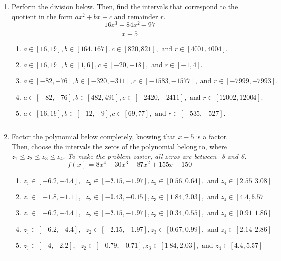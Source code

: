 \documentclass[14pt]{extbook}
\newcommand{\litem}[1]{\item#1\hspace*{-1cm}\rule{\textwidth}{0.4pt}}
\begin{document}
\begin{enumerate}
{\begin{enumerate}[label=\Alph*.]
\end{enumerate} }
\litem{
Perform the division below. Then, find the intervals that correspond to the quotient in the form $ax^2+bx+c$ and remainder $r$.\[ \frac{16x^{3} +84 x^{2} -97}{x + 5} \]\begin{enumerate}[label=\Alph*.]
\item \( a \in [16, 19], b \in [164, 167], c \in [820, 821], \text{ and } r \in [4001, 4004]. \)
\item \( a \in [16, 19], b \in [1, 6], c \in [-20, -18], \text{ and } r \in [-1, 4]. \)
\item \( a \in [-82, -76], b \in [-320, -311], c \in [-1583, -1577], \text{ and } r \in [-7999, -7993]. \)
\item \( a \in [-82, -76], b \in [482, 491], c \in [-2420, -2411], \text{ and } r \in [12002, 12004]. \)
\item \( a \in [16, 19], b \in [-12, -9], c \in [69, 77], \text{ and } r \in [-535, -527]. \)

\end{enumerate} }
\litem{
Factor the polynomial below completely, knowing that $x -5$ is a factor. Then, choose the intervals the zeros of the polynomial belong to, where $z_1 \leq z_2 \leq z_3 \leq z_4$. \textit{To make the problem easier, all zeros are between -5 and 5.}\[ f(x) = 8x^{4} -30 x^{3} -87 x^{2} +155 x + 150 \]\begin{enumerate}[label=\Alph*.]
\item \( z_1 \in [-6.2, -4.4], \text{   }  z_2 \in [-2.15, -1.97], z_3 \in [0.56, 0.64], \text{   and   } z_4 \in [2.55, 3.08] \)
\item \( z_1 \in [-1.8, -1.1], \text{   }  z_2 \in [-0.43, -0.15], z_3 \in [1.84, 2.03], \text{   and   } z_4 \in [4.4, 5.57] \)
\item \( z_1 \in [-6.2, -4.4], \text{   }  z_2 \in [-2.15, -1.97], z_3 \in [0.34, 0.55], \text{   and   } z_4 \in [0.91, 1.86] \)
\item \( z_1 \in [-6.2, -4.4], \text{   }  z_2 \in [-2.15, -1.97], z_3 \in [0.67, 0.99], \text{   and   } z_4 \in [2.14, 2.86] \)
\item \( z_1 \in [-4, -2.2], \text{   }  z_2 \in [-0.79, -0.71], z_3 \in [1.84, 2.03], \text{   and   } z_4 \in [4.4, 5.57] \)


\end{enumerate}}
\end{enumerate}
\end{document}

